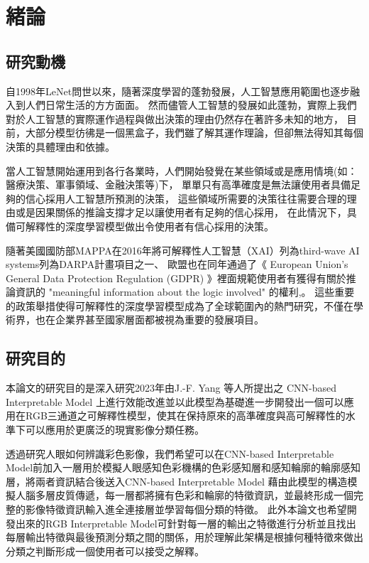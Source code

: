\documentclass[class=NCU_thesis, crop=false]{standalone}
\begin{document}
\chapter{緒論}
\section{研究動機}

自1998年LeNet\cite{726791}問世以來，隨著深度學習的蓬勃發展，人工智慧應用範圍也逐步融入到人們日常生活的方方面面。
然而儘管人工智慧的發展如此蓬勃，實際上我們對於人工智慧的實際運作過程與做出決策的理由仍然存在著許多未知的地方，
目前，大部分模型彷彿是一個黑盒子，我們雖了解其運作理論，但卻無法得知其每個決策的具體理由和依據。

當人工智慧開始運用到各行各業時，人們開始發覺在某些領域或是應用情境(如：醫療決策、軍事領域、金融決策等)下，
單單只有高準確度是無法讓使用者具備足夠的信心採用人工智慧所預測的決策，
這些領域所需要的決策往往需要合理的理由或是因果關係的推論支撐才足以讓使用者有足夠的信心採用，
在此情況下，具備可解釋性的深度學習模型做出令使用者有信心採用的決策。

隨著美國國防部MAPPA在2016年將可解釋性人工智慧（XAI）列為third-wave AI systems列為DARPA計畫項目之一\cite{DARPA}、
歐盟也在同年通過了《 European Union's General Data Protection Regulation (GDPR) 》裡面規範使用者有獲得有關於推論資訊的 "meaningful information about the logic involved" 的權利\cite{GDPR2016a},\cite{doi:10.1080/13600834.2019.1573501}。 這些重要的政策舉措使得可解釋性的深度學習模型成為了全球範圍內的熱門研究，不僅在學術界，也在企業界甚至國家層面都被視為重要的發展項目。

\pagebreak
\section{研究目的}
本論文的研究目的是深入研究2023年由J.-F. Yang 等人所提出之 CNN-based Interpretable Model \cite{YangCNNInterpretable}上進行效能改進並以此模型為基礎進一步開發出一個可以應用在RGB三通道之可解釋性模型，使其在保持原來的高準確度與高可解釋性的水準下可以應用於更廣泛的現實影像分類任務。

透過研究人眼如何辨識彩色影像，我們希望可以在CNN-based Interpretable Model前加入一層用於模擬人眼感知色彩機構的色彩感知層和感知輪廓的輪廓感知層，將兩者資訊結合後送入CNN-based Interpretable Model 藉由此模型的構造模擬人腦多層皮質傳遞，每一層都將擁有色彩和輪廓的特徵資訊，並最終形成一個完整的影像特徵資訊輸入進全連接層並學習每個分類的特徵。
此外本論文也希望開發出來的RGB Interpretable Model可針對每一層的輸出之特徵進行分析並且找出每層輸出特徵與最後預測分類之間的關係，用於理解此架構是根據何種特徵來做出分類之判斷形成一個使用者可以接受之解釋。
\end{document}

